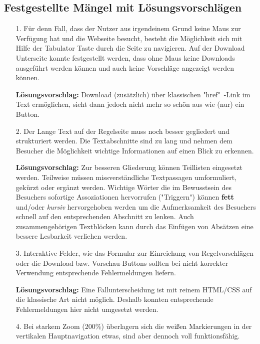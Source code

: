 \documentclass{scrartcl}
\begin{document}
\subsection*{Festgestellte Mängel mit Lösungsvorschlägen}
\begin{itemize}

\item[1.]Für denn Fall, dass der Nutzer aus irgendeinem Grund keine Maus zur Verfügung hat und die Webseite besucht, besteht die Möglichkeit sich mit Hilfe der Tabulator Taste durch die Seite zu navigieren. Auf der Download Unterseite konnte festgestellt werden, dass ohne Maus keine Downloads ausgeführt werden können und auch keine Vorschläge angezeigt werden können.

\textbf{Lösungsvorschlag:} Download (zusätzlich) über klassischen "href"\ -Link im Text ermöglichen, sieht dann jedoch nicht mehr so schön aus wie (nur) ein Button.

\item[2.]Der Lange Text auf der Regelseite muss noch besser gegliedert und strukturiert werden. Die Textabschnitte sind zu lang und nehmen dem Besucher die Möglichkeit wichtige Informationen auf einen Blick zu erkennen.

\textbf{Lösungsvorschlag:} Zur besseren Gliederung können Teillisten eingesetzt werden. Teilweise müssen missverständliche Textpassagen umformuliert, gekürzt oder ergänzt werden. Wichtige Wörter die im Bewusstsein des Besuchers sofortige Assoziationen hervorrufen ("Triggern") können \textbf{fett} und/oder \textit{kursiv} hervorgehoben werden um die Aufmerksamkeit des Besuchers schnell auf den entsprechenden Abschnitt zu lenken. Auch zusammengehörigen Textblöcken kann durch das Einfügen von Absätzen eine bessere Lesbarkeit verliehen werden.

\item[3.]Interaktive Felder, wie das Formular zur Einreichung von Regelvorschlägen oder die Download bzw. Vorschau-Buttons sollten bei nicht korrekter Verwendung entsprechende Fehlermeldungen liefern.

\textbf{Lösungsvorschlag:} Eine Fallunterscheidung ist mit reinem HTML/CSS auf die klassische Art nicht möglich. Deshalb konnten entsprechende Fehlermeldungen hier nicht umgesetzt werden.

\item[4.] Bei starkem Zoom (200\%) überlagern sich die weißen Markierungen in der vertikalen Hauptnavigation etwas, sind aber dennoch voll funktionsfähig. 


\end{itemize}
\end{document}
